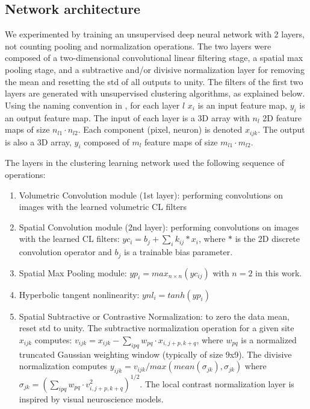 \documentclass{article} %
\begin{document}
\subsection{Network architecture}
\label{sec-net-arch}

We experimented by training an unsupervised deep neural network with 2 layers, not counting pooling and normalization operations. The two layers were composed of a two-dimensional convolutional linear filtering stage, a spatial max pooling stage, and a subtractive and/or divisive normalization layer for removing the mean and resetting the std of all outputs to unity. 
The filters of the first two layers are generated with unsupervised clustering algorithms, as explained below. 
Using the naming convention in \cite{lecuniscas10}, for each layer $l$  $x_i$ is an input feature map, $y_i$ is an output feature map. The input of each layer is a 3D array with $n_l$ 2D feature maps of size $n_{l1} \cdot n_{l2}$. Each component (pixel, neuron) is denoted $x_{ijk}$. The output is also a 3D array, $y_i$ composed of $m_l$ feature maps of size $m_{l1} \cdot m_{l2}$.

The layers in the clustering learning network used the following sequence of operations:
\begin{enumerate}
\item Volumetric Convolution module (1st layer): performing convolutions on images with the learned volumetric CL filters
\item Spatial Convolution module (2nd layer): performing convolutions on images with the learned CL filters: $yc_i=b_j+\sum_i{k_{ij}\ast x_i}$, where $\ast$ is the 2D discrete convolution operator and $b_j$ is a trainable bias parameter.
\item Spatial Max Pooling module: $yp_i = max_{n \times n}(yc_{ij})$ with $n =  2$ in this work.
\item Hyperbolic tangent nonlinearity: $ynl_i = tanh(yp_i )$
\item Spatial Subtractive or Contrastive Normalization: to zero the data mean, reset std to unity. The subtractive normalization operation for a given site $x_{ijk}$ computes: $v_{ijk} = x_{ijk} - \sum_{ipq} w_{pq} \cdot x_{i,j+p,k+q}$, where $w_{pq}$ is a normalized truncated Gaussian weighting window (typically of size 9x9). The divisive normalization computes $y_{ijk} = v_{ijk}/max(mean(\sigma_{jk}),\sigma_{jk})$ where $\sigma_{jk} = (\sum_{ipq} w_{pq} \cdot v^2_{i,j+p,k+q})^{1/2}$. The local contrast normalization layer is inspired by visual neuroscience models.
\end{enumerate}
\end{document}

